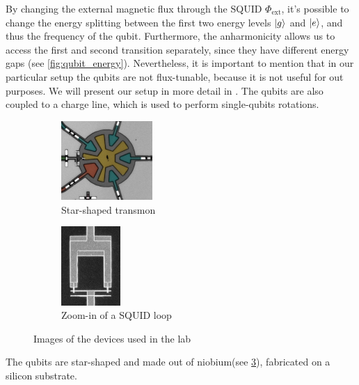 By changing the external magnetic flux through the SQUID $\Phi_\text{ext}$, it's possible to change the energy splitting between the first two energy levels $\ket{g}$ and $\ket{e}$, and thus the frequency of the qubit.
Furthermore, the anharmonicity allows us to access the first and second transition separately, since they have different energy gaps (see \cref{fig:qubit_energy}).
Nevertheless, it is important to mention that in our particular setup the qubits are not flux-tunable, because it is not useful for out purposes.
We will present our setup in more detail in .
The qubits are also coupled to a charge line, which is used to perform single-qubits rotations.
\begin{figure}[t]
    \centering
    \begin{subfigure}[b]{0.45\linewidth}
      \centering
      \includegraphics[height=3cm]{Images/Chap1/star_transmon.png}
      \caption{Star-shaped transmon}
      \label{fig:stqr_transmon}
    \end{subfigure}
    \hfill
    \begin{subfigure}[b]{0.45\linewidth}
      \centering
      \includegraphics[height=3cm]{Images/Chap1/SQUID.jpeg}
      \caption{Zoom-in of a SQUID loop}
      \label{fig:squid_loop}
    \end{subfigure}
    \caption{Images of the devices used in the lab}
    \label{fig:transmon_squid_images}
  \end{figure}

The qubits are star-shaped and made out of niobium(see \cref{fig:transmon_squid_images}), fabricated on a silicon substrate.
